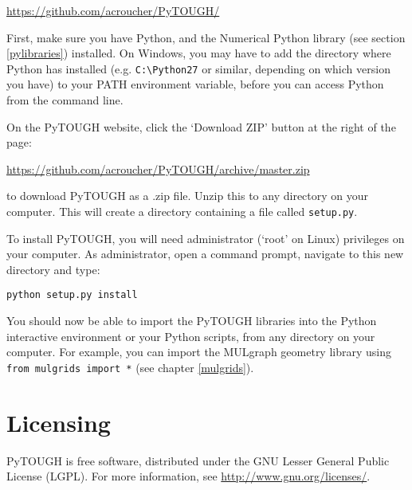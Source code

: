 \url{https://github.com/acroucher/PyTOUGH/}

First, make sure you have Python, and the Numerical Python library (see section \ref{pylibraries}) installed.  On Windows, you may have to add the directory where Python has installed (e.g. \texttt{C:\textbackslash Python27} or similar, depending on which version you have) to your PATH environment variable, before you can access Python from the command line.

On the PyTOUGH website, click the `Download ZIP' button at the right of the page:

\url{https://github.com/acroucher/PyTOUGH/archive/master.zip}

to download PyTOUGH as a .zip file.  Unzip this to any directory on your computer.  This will create a directory containing a file called \texttt{setup.py}.

To install PyTOUGH, you will need administrator (`root' on Linux) privileges on your computer.  As administrator, open a command prompt, navigate to this new directory and type:

\begin{verbatim}
python setup.py install
\end{verbatim}

You should now be able to import the PyTOUGH libraries into the Python interactive environment or your Python scripts, from any directory on your computer.  For example, you can import the MULgraph geometry library using \texttt{from mulgrids import *} (see chapter \ref{mulgrids}).

\section{Licensing}

PyTOUGH is free software, distributed under the GNU Lesser General Public License (LGPL).  For more information, see \url{http://www.gnu.org/licenses/}.
